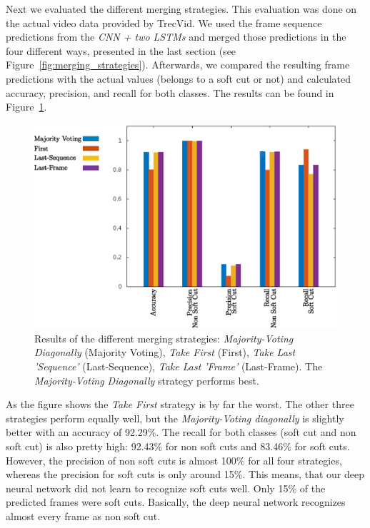 Next we evaluated the different merging strategies.
This evaluation was done on the actual video data provided by TrecVid.
We used the frame sequence predictions from the \textit{CNN + two LSTMs} and merged those predictions in the four different ways, presented in the last section (see Figure~\ref{fig:merging_strategies}).
Afterwards, we compared the resulting frame predictions with the actual values (belongs to a soft cut or not) and calculated accuracy, precision, and recall for both classes.
The results can be found in Figure~\ref{fig:evaluation_net}.
\begin{figure}[!htb]
	\centering
	\includegraphics[scale=.7]{images/evalutation_net.eps}
	\caption{Results of the different merging strategies: \textit{Majority-Voting Diagonally} (Majority Voting), \textit{Take First} (First), \textit{Take Last 'Sequence'} (Last-Sequence), \textit{Take Last 'Frame'} (Last-Frame). The \textit{Majority-Voting Diagonally} strategy performs best.}
	\label{fig:evaluation_net}
\end{figure}
As the figure shows the \textit{Take First} strategy is by far the worst.
The other three strategies perform equally well, but the \textit{Majority-Voting diagonally} is slightly better with an accuracy of 92.29\%.
The recall for both classes (soft cut and non soft cut) is also pretty high: 92.43\% for non soft cuts and 83.46\% for soft cuts.
However, the precision of non soft cuts is almost 100\% for all four strategies, whereas the precision for soft cuts is only around 15\%.
This means, that our deep neural network did not learn to recognize soft cuts well.
Only 15\% of the predicted frames were soft cuts.
Basically, the deep neural network recognizes almost every frame as non soft cut.

